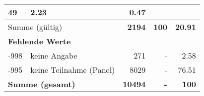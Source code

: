\begin{longtable}{lXrrr}
       \num{49} &
       \num[round-mode=places,round-precision=2]{2.23} &
         \num[round-mode=places,round-precision=2]{0.47} \\
     \midrule
     \multicolumn{2}{l}{Summe (gültig)} &
       \textbf{\num{2194}} &
     \textbf{\num{100}} &
       \textbf{\num[round-mode=places,round-precision=2]{20.91}} \\
     \multicolumn{5}{l}{\textbf{Fehlende Werte}}\\
       -998 &
       keine Angabe &
         \num{271} &
        - &
         \num[round-mode=places,round-precision=2]{2.58} \\
       -995 &
       keine Teilnahme (Panel) &
         \num{8029} &
        - &
         \num[round-mode=places,round-precision=2]{76.51} \\
     \midrule
     \multicolumn{2}{l}{\textbf{Summe (gesamt)}} &
          \textbf{\num{10494}} &
        \textbf{-} &
        \textbf{\num{100}} \\
     \bottomrule
     \end{longtable}
     
